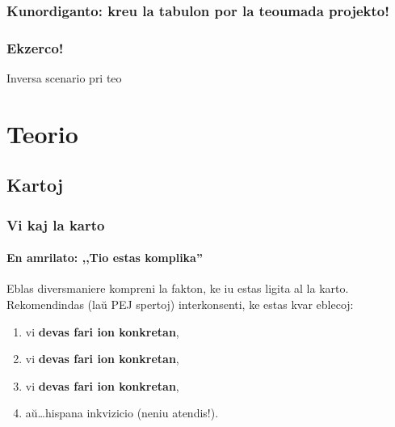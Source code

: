 \documentclass{beamer}
\begin{document}
  \begin{frame}
    \frametitle{Kunordiganto: kreu la tabulon por la teoumada projekto!}
    
  \end{frame}

  \begin{frame}
    \frametitle{Ekzerco!}

    Inversa scenario pri teo
  \end{frame}

\section{Teorio}

\subsection{Kartoj}

  \begin{frame}
    \frametitle{Vi kaj la karto}
    \framesubtitle{En amrilato: ,,Tio estas komplika''}
	
	Eblas diversmaniere kompreni la fakton, ke iu estas ligita al la karto. Rekomendindas (laŭ PEJ spertoj) interkonsenti, ke estas kvar eblecoj:
	\begin{enumerate}
		\item vi \textbf{devas fari ion konkretan},
		\item vi \textbf{devas fari ion konkretan},
		\item vi \textbf{devas fari ion konkretan},
		\pause
		\item aŭ\dots \pause hispana inkvizicio \alert{(neniu atendis!)}.
	\end{enumerate}

  \end{frame}
\end{document}
